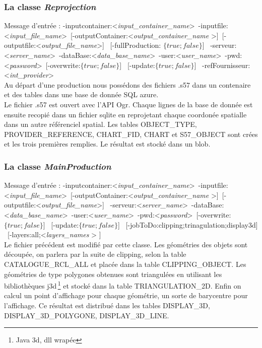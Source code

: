 \subsubsection{La classe \textit{Reprojection}}
Message d'entrée : 
-inputcontainer:\textless \textit{input\_container\_name}\textgreater \   
-inputfile:\textless \textit{input\_file\_name}\textgreater \ 
[-outputContainer:\textless \textit{output\_container\_name} \textgreater ]\  
[-outputfile:\textless \textit{output\_file\_name}\textgreater ] \ 
[-fullProduction: $\{true;false\}$] \ 
-serveur:\textless \textit{server\_name}\textgreater \   
-dataBase:\textless \textit{data\_base\_name}\textgreater \   
-user:\textless \textit{user\_name}\textgreater  \ 
-pwd:\textless \textit{password}\textgreater  \ 
[-overwrite:$\{true;false\}$] \ 
[-update:$\{true;false\}$] \ 
-refFournisseur:\textless \textit{int\_provider}\textgreater \\   

Au départ d'une production nous possédons des fichiers .s57 dans un
contenaire et des tables dans une base de donnée SQL azure.  \\

Le fichier .s57 est ouvert avec l'API Ogr. Chaque lignes de la base de
donnée est ensuite recopié dans un fichier sqlite en reprojetant
chaque coordonée spatialle dans un autre référenciel spatial. Les
tables OBJECT\_TYPE, PROVIDER\_REFERENCE, CHART\_FID, CHART et
S57\_OBJECT sont crées et les trois premières remplies. Le résultat
est stocké dans un blob.


\subsubsection{La classe \textit{MainProduction}}
Message d'entrée : 
-inputcontainer:\textless \textit{input\_container\_name}\textgreater \   
-inputfile:\textless \textit{input\_file\_name}\textgreater \ 
[-outputContainer:\textless \textit{output\_container\_name} \textgreater ]\  
[-outputfile:\textless \textit{output\_file\_name}\textgreater ] \ 
-serveur:\textless \textit{server\_name}\textgreater \   
-dataBase:\textless \textit{data\_base\_name}\textgreater \   
-user:\textless \textit{user\_name}\textgreater  \ 
-pwd:\textless \textit{password}\textgreater  \ 
[-overwrite:$\{true;false\}$] \ 
[-update:$\{true;false\}$] \ 
[-jobToDo:{clipping;trinagulation;display3d}] \ 
[-layers:{all;\textless \textit{layers\_names} \textgreater} ] \\ 

Le fichier précédent est modifié par cette classe. Les géométries des
objets sont découpée, on parlera par la suite de clipping, selon la
table CATALOGUE\_RCL\_ALL et placée dans la table
CLIPPING\_OBJECT. Les géométries de type polygones obtenues sont
triangulées en utilisant les bibliothèques j3d\,\footnote{Java 3d, dll
  wrapée} et stocké dans la table TRIANGULATION\_2D. Enfin on calcul
un point d'affichage pour chaque géométrie, un sorte de barycentre
pour l'affichage. Ce résultat est distribué dans les tables
DISPLAY\_3D, DISPLAY\_3D\_POLYGONE, DISPLAY\_3D\_LINE.




